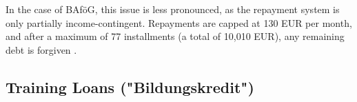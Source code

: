 In the case of BAföG, this issue is less pronounced, as the repayment system is only partially income-contingent. Repayments are capped at 130 EUR per month, and after a maximum of 77 installments (a total of 10,010 EUR), any remaining debt is forgiven \citep{studentenwerk_bafog}.




\subsection{Training Loans ("Bildungskredit")}



